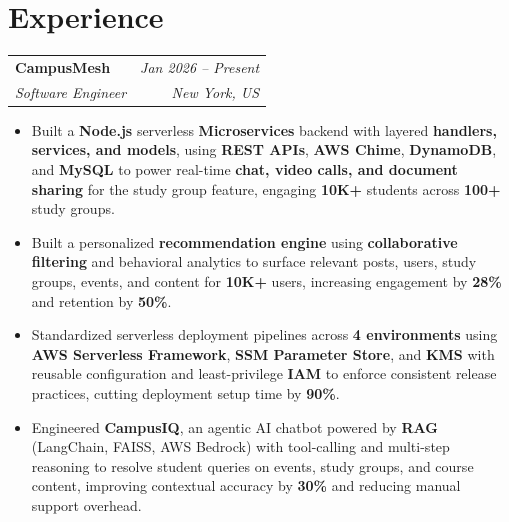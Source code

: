 \documentclass[10pt]{article}
\makeatletter
\newcommand{\resumeSubheading}[4]{
  \vspace{3pt}
  \begin{tabular*}{\textwidth}{@{}l@{\extracolsep{\fill}}r@{}}
    \textbf{#1} & \textit{#4} \\
    \textit{#3} & \textit{#2} \\
  \end{tabular*}\vspace{0pt}
}
\newcommand{\resumeItemListStart}{\begin{itemize}[leftmargin=12pt, itemsep=0.4pt, topsep=0.6pt, parsep=0pt]}
\newcommand{\resumeItemListEnd}{\end{itemize}\vspace{-1pt}}
\makeatother
\begin{document}
\section{Experience}
\resumeSubheading
{CampusMesh}{New York, US}
{Software Engineer}{Jan 2026 -- Present}
\resumeItemListStart
  \item \footnotesize{Built a \textbf{Node.js} serverless \textbf{Microservices} backend with layered \textbf{handlers, services, and models}, using \textbf{REST APIs}, \textbf{AWS Chime}, \textbf{DynamoDB}, and \textbf{MySQL} to power real-time \textbf{chat, video calls, and document sharing} for the study group feature, engaging \textbf{10K+} students across \textbf{100+} study groups.}
  \item \footnotesize{Built a personalized \textbf{recommendation engine} using \textbf{collaborative filtering} and behavioral analytics to surface relevant posts, users, study groups, events, and content for \textbf{10K+} users, increasing engagement by \textbf{28\%} and retention by \textbf{50\%}.}
  \item \footnotesize{Standardized serverless deployment pipelines across \textbf{4 environments} using \textbf{AWS Serverless Framework}, \textbf{SSM Parameter Store}, and \textbf{KMS} with reusable configuration and least-privilege \textbf{IAM} to enforce consistent release practices, cutting deployment setup time by \textbf{90\%}.}
  \item \footnotesize{Engineered \textbf{CampusIQ}, an agentic AI chatbot powered by \textbf{RAG} (LangChain, FAISS, AWS Bedrock) with tool-calling and multi-step reasoning to resolve student queries on events, study groups, and course content, improving contextual accuracy by \textbf{30\%} and reducing manual support overhead.}
\resumeItemListEnd
\vspace{3pt}
\end{document}
